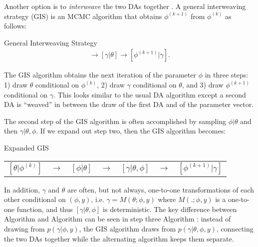\documentclass[12pt]{article}
\begin{document}
Another option is to {\it interweave} the two DAs together \cite{yu2011center}. A general interweaving strategy (GIS) is an MCMC algorithm that obtains $\phi^{(k+1)}$ from $\phi^{(k)}$ as follows:
\begin{alg*}[GIS]General Interweaving Strategy\label{alg:GIS}
  \begin{align*}
    [\theta|\phi^{(k)}] \to [\gamma|\theta] \to [\phi^{(k+1)}|\gamma].
  \end{align*}
\end{alg*}
\noindent The GIS algorithm obtains the next iteration of the parameter $\phi$ in three steps: 1) draw $\theta$ conditional on $\phi^{(k)}$, 2) draw $\gamma$ conditional on $\theta$, and 3) draw $\phi^{(k+1)}$ conditional on $\gamma$. This looks similar to the usual DA algorithm except a second DA is ``weaved'' in between the draw of the first DA and of the parameter vector. 

The second step of the GIS algorithm is often accomplished by sampling $\phi|\theta$ and then $\gamma|\theta,\phi$. If we expand out step two, then the GIS algorithm becomes:
\begin{alg*}[eGIS]Expanded GIS\label{alg:GIS2}
  \begin{center}
    \begin{tabular}{lllllll}
      $[\theta|\phi^{(k)}]$& $\to$& $[\phi|\theta]$& $\to $&$[\gamma|\theta,\phi]$& $\to$& $[\phi^{(k+1)}|\gamma]$
    \end{tabular}
  \end{center}
\end{alg*}
\noindent
In addition, $\gamma$ and $\theta$ are often, but not always, one-to-one transformations of each other conditional on $(\phi,y)$, i.e. $\gamma = M(\theta;\phi,y)$ where $M(.;\phi,y)$ is a one-to-one function, and thus $[\gamma|\theta,\phi]$ is deterministic.
The key difference between Algorithm  and Algorithm  can be seen in step three Algorithm : instead of drawing from $p(\gamma|\phi,y)$, the GIS algorithm draws from $p(\gamma|\theta,\phi,y)$, connecting the two DAs together while the alternating algorithm keeps them separate.
\end{document}
